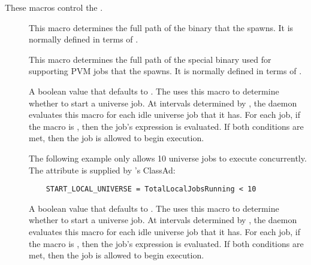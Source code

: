 These macros control the .
\begin{description}

\item[] \label{param:Shadow} This macro determines the
  full path of the  binary that the 
  spawns.  It is normally defined in terms of . 
  
\item[] \label{param:ShadowPvm} This macro
  determines the full path of the special  binary
  used for supporting PVM jobs that the  spawns.  It is
  normally defined in terms of .
  
\item[] \label{param:StartLocalUniverse}
  A boolean value that defaults to .
  The  uses this macro to determine whether to start
  a  universe job. 
  At intervals determined by , 
  the  daemon evaluates this macro
  for each idle  universe job that it has.
  For each job, if the  
  macro is , then the job's  expression
  is evaluated. If both conditions are met, then the job is allowed
  to begin execution. 
  
  The following example only allows 10  universe jobs to
  execute concurrently. The attribute 
  is supplied by 's ClassAd:
  
  \footnotesize
  \begin{verbatim}
    START_LOCAL_UNIVERSE = TotalLocalJobsRunning < 10
  \end{verbatim}
  \normalsize
  
\item[] \label{param:StartSchedulerUniverse}
  A boolean value that defaults to .
  The  uses this macro to determine whether to start
  a  universe job. 
  At intervals determined by , 
  the  daemon evaluates this macro
  for each idle  universe job that it has.
  For each job, if the  
  macro is , then the job's  expression
  is evaluated. If both conditions are met, then the job is allowed
  to begin execution. 
  

\end{description}
